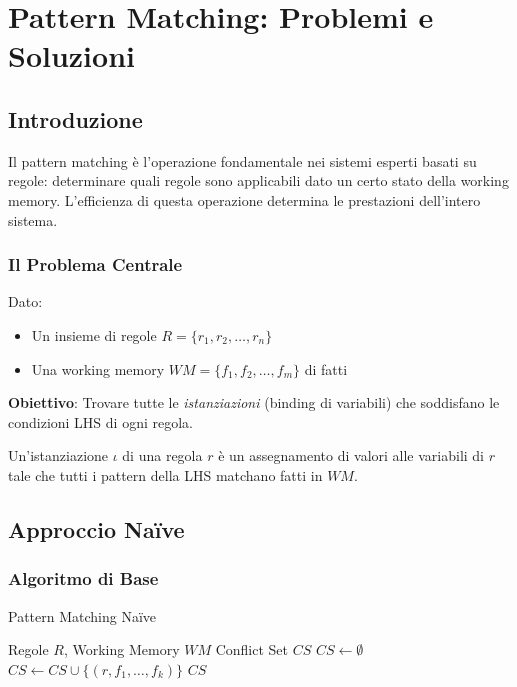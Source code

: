 
\chapter{Pattern Matching: Problemi e Soluzioni}
\label{cap:pattern_matching}

\section{Introduzione}

Il pattern matching è l'operazione fondamentale nei sistemi esperti basati su regole: determinare quali regole sono applicabili dato un certo stato della working memory. L'efficienza di questa operazione determina le prestazioni dell'intero sistema.

\subsection{Il Problema Centrale}

Dato:
\begin{itemize}
\item Un insieme di regole $R = \{r_1, r_2, \ldots, r_n\}$
\item Una working memory $WM = \{f_1, f_2, \ldots, f_m\}$ di fatti
\end{itemize}

\textbf{Obiettivo}: Trovare tutte le \textit{istanziazioni} (binding di variabili) che soddisfano le condizioni LHS di ogni regola.

\begin{definizione}[Istanziazione]
Un'istanziazione $\iota$ di una regola $r$ è un assegnamento di valori alle variabili di $r$ tale che tutti i pattern della LHS matchano fatti in $WM$.
\end{definizione}

\section{Approccio Naïve}

\subsection{Algoritmo di Base}

\begin{algorithm}
\caption{Pattern Matching Naïve}
\begin{algorithmic}[1]
\Require Regole $R$, Working Memory $WM$
\Ensure Conflict Set $CS$
  \State $CS \gets \emptyset$
        \State $CS \gets CS \cup \{(r, f_1, \ldots, f_k)\}$
      \EndIf
    \EndFor
  \EndFor
  \State \Return $CS$
\EndFunction
\end{algorithmic}
\end{algorithm}

